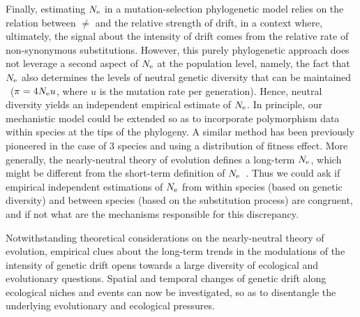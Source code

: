 Finally, estimating $N_{\text{e}}$ in a mutation-selection phylogenetic model relies on the relation between $\ne$ and the relative strength of drift, in a context where, ultimately, the signal about the intensity of drift comes from the relative rate of non-synonymous substitutions.
However, this purely phylogenetic approach does not leverage a second aspect of $N_{\text{e}}$ at the population level, namely, the fact that $N_{\text{e}}$ also determines the levels of neutral genetic diversity that can be maintained ~($\pi=4N_{\text{e}} u$, where $u$ is the mutation rate per generation).
Hence, neutral diversity yields an independent empirical estimate of $N_{\text{e}}$.
In principle, our mechanistic model could be extended so as to incorporate polymorphism data within species at the tips of the phylogeny.
A similar method has been previously pioneered in the case of 3 species and using a distribution of fitness effect\citep{Wilson2011}.
More generally, the nearly-neutral theory of evolution defines a long-term $N_{\text{e}}$, which might be different from the short-term definition of $N_{\text{e}}$~\citep{Platt2018}.
Thus we could ask if empirical independent estimations of $N_{\text{e}}$ from within species (based on genetic diversity) and between species (based on the substitution process) are congruent, and if not what are the mechanisms responsible for this discrepancy.

Notwithstanding theoretical considerations on the nearly-neutral theory of evolution, empirical clues about the long-term trends in the modulations of the intensity of genetic drift opens towards a large diversity of ecological and evolutionary questions.
Spatial and temporal changes of genetic drift along ecological niches and events can now be investigated, so as to disentangle the underlying evolutionary and ecological pressures.

